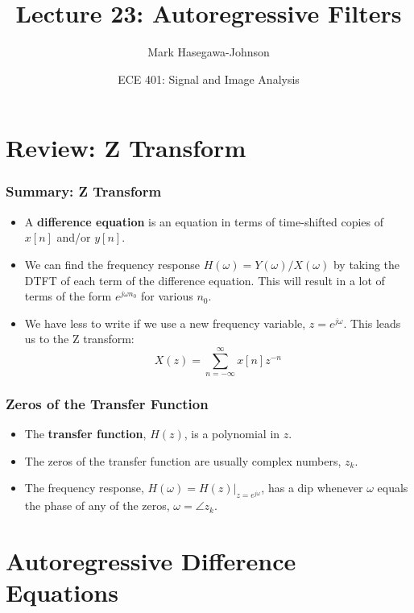 \documentclass{beamer}
\title{Lecture 23: Autoregressive Filters}
\author{Mark Hasegawa-Johnson}
\date{ECE 401: Signal and Image Analysis}
\begin{document}
\begin{frame}
  \maketitle
\end{frame}

\begin{frame}
  \tableofcontents
\end{frame}

\section[Review]{Review: Z Transform}
\setcounter{subsection}{1}

\begin{frame}
  \frametitle{Summary: Z Transform}
  \begin{itemize}
  \item A {\bf difference equation} is an equation in terms of
    time-shifted copies of $x[n]$ and/or $y[n]$.
  \item We can find the frequency response
    $H(\omega)=Y(\omega)/X(\omega)$ by taking the DTFT of each term of
    the difference equation.  This will result in a lot of terms of
    the form $e^{j\omega n_0}$ for various $n_0$.
  \item We have less to write if we use a new frequency variable,
    $z=e^{j\omega}$.  This leads us to the Z transform:
    \[
    X(z) = \sum_{n=-\infty}^\infty x[n]z^{-n}
    \]
  \end{itemize}
\end{frame}

\begin{frame}
  \frametitle{Zeros of the Transfer Function}
  \begin{itemize}
  \item The {\bf transfer function}, $H(z)$, is a polynomial in $z$.
  \item The zeros of the transfer function are usually complex numbers, $z_k$.
  \item The frequency response, $H(\omega) = H(z)\vert_{z=e^{j\omega}}$, has a dip
    whenever $\omega$ equals the phase of any of the zeros, $\omega=\angle z_k$.
  \end{itemize}
\end{frame}
    
\section[Autoregressive]{Autoregressive Difference Equations}
\setcounter{subsection}{1}
\end{document}
